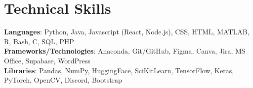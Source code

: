 \section{Technical Skills}
 \begin{itemize}[leftmargin=0.15in, label={}]
    \small{\item{
     \textbf{Languages}{: Python, Java, Javascript (React, Node.js), CSS, HTML, MATLAB, R, Bash, C, SQL, PHP} \\
     \textbf{Frameworks/Technologies}{: Anaconda, Git/GitHub, Figma, Canva, Jira, MS Office, Supabase, WordPress} \\
     \textbf{Libraries}{: Pandas, NumPy, HuggingFace, SciKitLearn, TensorFlow, Keras, PyTorch, OpenCV, Discord, Bootstrap}
    }}
 \end{itemize}